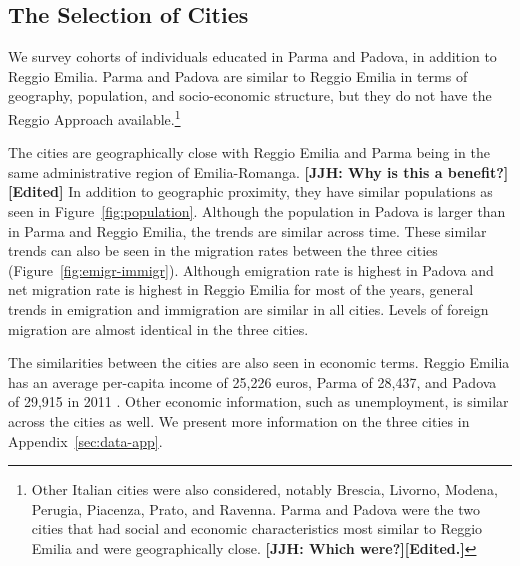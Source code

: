\subsection{The Selection of Cities}

We survey cohorts of individuals educated in Parma and Padova, in addition to Reggio Emilia. Parma and Padova are similar to Reggio Emilia in terms of geography, population, and socio-economic structure, but they do not have the Reggio Approach available.\footnote{Other Italian cities were also considered, notably Brescia, Livorno, Modena, Perugia, Piacenza, Prato, and Ravenna. Parma and Padova were the two cities that had social and economic characteristics most similar to Reggio Emilia and were geographically close. \textbf{[JJH: Which were?][Edited.]}}

The cities are geographically close with Reggio Emilia and Parma being in the same administrative region of Emilia-Romanga. \textbf{[JJH: Why is this a benefit?][Edited]} In addition to geographic proximity, they have similar populations as seen in Figure~\ref{fig:population}. Although the population in Padova is larger than in Parma and Reggio Emilia, the trends are similar across time. These similar trends can also be seen in the migration rates between the three cities (Figure~\ref{fig:emigr-immigr}). Although emigration rate is highest in Padova and net migration rate is highest in Reggio Emilia for most of the years, general trends in emigration and immigration are similar in all cities. Levels of foreign migration are almost identical in the three cities.

The similarities between the cities are also seen in economic terms. Reggio Emilia has an average per-capita income of 25,226 euros, Parma of 28,437, and Padova of 29,915 in 2011 \citep{Comuni-Italiani_2017_Redditi-Ipref-per-Regione-2011}. Other economic information, such as unemployment, is similar across the cities as well. We present more information on the three cities in Appendix~\ref{sec:data-app}.

